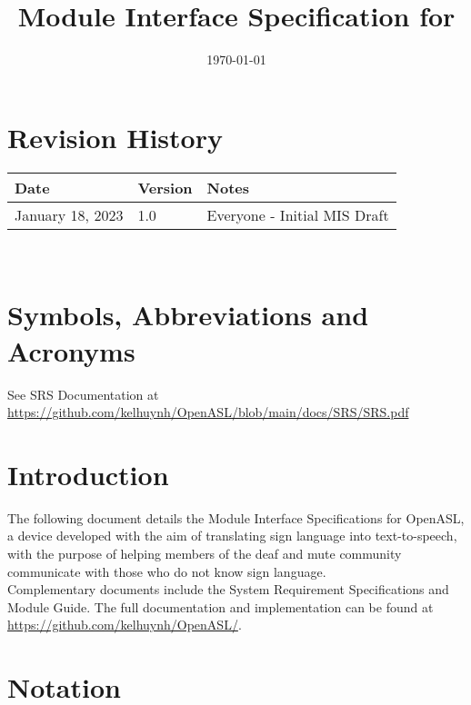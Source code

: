 \documentclass[12pt, titlepage]{article}
\begin{document}
\title{Module Interface Specification for \progname{}} 
\author{\authname}
\date{\today}

\maketitle


\section{Revision History}

\begin{tabularx}{\textwidth}{p{3cm}p{2cm}X}
\toprule {\bf Date} & {\bf Version} & {\bf Notes}\\
\midrule
January 18, 2023 & 1.0 & Everyone - Initial MIS Draft\\
\bottomrule
\end{tabularx}

~\newpage

\section{Symbols, Abbreviations and Acronyms}

See SRS Documentation at \url{https://github.com/kelhuynh/OpenASL/blob/main/docs/SRS/SRS.pdf}

\newpage

\tableofcontents

\newpage


\section{Introduction}

The following document details the Module Interface Specifications for
OpenASL, a device developed with the aim of translating sign language into text-to-speech, 
with the purpose of helping members of the deaf and mute community communicate with those 
who do not know sign language.\\

Complementary documents include the System Requirement Specifications
and Module Guide.  The full documentation and implementation can be
found at \url{https://github.com/kelhuynh/OpenASL/}.\\

\section{Notation}
\end{document}
